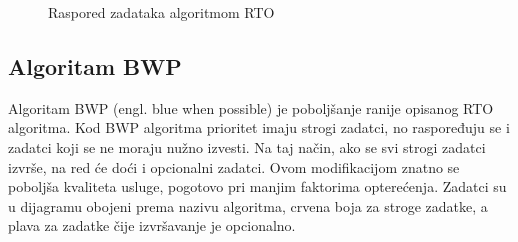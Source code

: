 \documentclass[../zavrsni.tex]{subfiles}
\begin{document}
\begin{figure}[h!]
    \centering

    \begin{RTGrid}[width=13cm]{3}{24}

    
  
    
    

    \end{RTGrid}

    \caption{Raspored zadataka algoritmom RTO}
    \label{fig:ex1}
  \end{figure}


\subsection{Algoritam BWP}

Algoritam BWP (engl. blue when possible) je poboljšanje ranije opisanog RTO algoritma. Kod BWP algoritma prioritet imaju strogi zadatci, 
no raspoređuju se i zadatci koji se ne moraju nužno izvesti. Na taj način, ako se svi strogi zadatci izvrše, na red će doći
i opcionalni zadatci. Ovom modifikacijom znatno se poboljša kvaliteta usluge, pogotovo pri
 manjim faktorima opterećenja. Zadatci su u dijagramu obojeni prema nazivu algoritma, crvena boja za stroge zadatke, a plava za zadatke 
 čije izvršavanje je opcionalno. 
\end{document}
